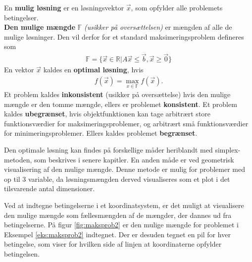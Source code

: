 \begin{defn}
En \textbf{mulig løsning} er en løsningsvektor $\vec{x}$, som opfylder alle problemets betingelser.\\
\textbf{Den mulige mængde} $\mathds{F}$ \textit{(usikker på oversættelsen)} er mængden af alle de mulige løsninger. Den vil derfor for et standard maksimeringsproblem defineres som
\begin{align*}
\mathds{F}=\{\vec{x} \in \mathds{R}|A\vec{x} \leq \vec{b}, \vec{x} \geq \vec{0}\}
\end{align*}
En vektor $\vec{x}$ kaldes en \textbf{optimal løsning}, hvis 
\begin{align}
	f(\vec{x})=\max\limits_{x \in \mathds{F}}f(\vec{x}).
\end{align}
Et problem kaldes \textbf{inkonsistent} (usikker på oversættelse) hvis den mulige mængde er den tomme mængde, ellers er problemet \textbf{konsistent}. Et problem kaldes \textbf{ubegrænset}, hvis objektfunktionen kan tage arbitrært store funktionsværdier for maksimeringsproblemer, og arbitrært små funktionsværdier for minimeringsproblemer. Ellers kaldes problemet \textbf{begrænset}.
\end{defn}

Den optimale løsning kan findes på forskellige måder heriblandt med simplex-metoden, som beskrives i senere kapitler. En anden måde er ved geometrisk visualisering af den mulige mængde. Denne metode er mulig for problemer med op til 3 variable, da løsningsmængden derved visualiseres som et plot i det tilsvarende antal dimensioner. 

\begin{eks}
Ved at indtegne betingelserne i et koordinatsystem, er det muligt at visualisere den mulige mængde som fællesmængden af de mængder, der dannes ud fra betingelserne. På figur \ref{fig:maksprob2} er den mulige mængde for problemet i Eksempel \ref{eks:maksprob2} indtegnet. Der er desuden tegnet en pil for hver betingelse, som viser for hvilken side af linjen at koordinaterne opfylder betingelsen.

\begin{center}
	
	\label{fig:maksprob2}
\end{center}

\end{eks}

